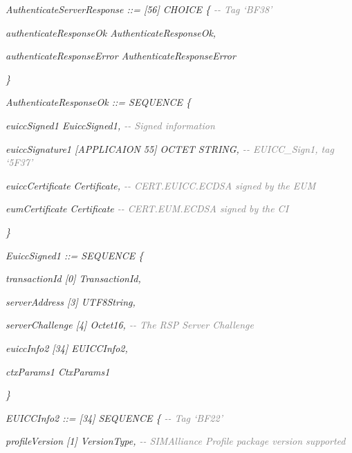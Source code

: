 \documentclass[10pt, oneside]{book}
\begin{document}
\textit{AuthenticateServerResponse ::= [56] CHOICE \{ \textcolor{gray}{{-}{-} Tag `BF38'}}

\hspace{0.75cm} \textit{authenticateResponseOk AuthenticateResponseOk,}

\hspace{0.75cm} \textit{authenticateResponseError AuthenticateResponseError}

\textit{\}\\}

\textit{AuthenticateResponseOk ::= SEQUENCE \{}

\hspace{0.75cm} \textit{euiccSigned1 EuiccSigned1, \textcolor{gray}{{-}{-} Signed information}}

\hspace{0.75cm} \textit{euiccSignature1 [APPLICAION 55] OCTET STRING, \textcolor{gray}{{-}{-} EUICC\_Sign1, tag `5F37'}}

\hspace{0.75cm} \textit{euiccCertificate Certificate, \textcolor{gray}{{-}{-} CERT.EUICC.ECDSA signed by the EUM}}

\hspace{0.75cm} \textit{eumCertificate Certificate \textcolor{gray}{{-}{-} CERT.EUM.ECDSA signed by the CI}}

\textit{\}\\}

\textit{EuiccSigned1 ::= SEQUENCE \{}

\hspace{0.75cm} \textit{transactionId [0] TransactionId,}

\hspace{0.75cm} \textit{serverAddress [3] UTF8String,}

\hspace{0.75cm} \textit{serverChallenge [4] Octet16, \textcolor{gray}{{-}{-} The RSP Server Challenge}}

\hspace{0.75cm} \textit{euiccInfo2 [34] EUICCInfo2,}

\hspace{0.75cm} \textit{ctxParams1 CtxParams1}

\textit{\}\\}

\textit{EUICCInfo2 ::= [34] SEQUENCE \{ \textcolor{gray}{{-}{-} Tag `BF22'}}

\hspace{0.75cm} \textit{profileVersion [1] VersionType, \textcolor{gray}{{-}{-} SIMAlliance Profile package version supported}}
\end{document}
